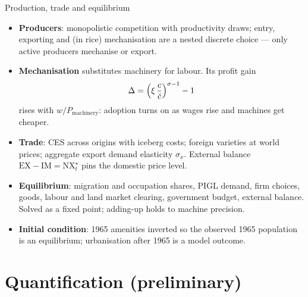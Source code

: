 \documentclass[10pt,aspectratio=169]{beamer}
\newcommand{\hl}[1]{\textcolor{mOrange}{#1}}
\begin{document}
\begin{frame}{Production, trade and equilibrium}
  \small
  \begin{itemize}
    \item \textbf{Producers}: monopolistic competition with productivity draws; entry,
          exporting and (in rice) mechanisation are a nested discrete choice --- only active
          producers mechanise or export.
    \item \textbf{Mechanisation} substitutes machinery for labour. Its profit gain
          \begin{equation*}
            \Delta=\Bigl(\xi\,\frac{c}{\breve c}\Bigr)^{\sigma-1}-1
          \end{equation*}
          rises with $w/P_{\text{machinery}}$: adoption turns on as \hl{wages rise and
          machines get cheaper}.
    \item \textbf{Trade}: CES across origins with iceberg costs; foreign varieties at
          world prices; aggregate export demand elasticity $\sigma_x$. External balance
          $\mathrm{EX}-\mathrm{IM}=\mathrm{NX}^\star_t$ pins the domestic price level.
    \item \textbf{Equilibrium}: migration and occupation shares, PIGL demand, firm choices,
          goods, labour and land market clearing, government budget, external balance.
          Solved as a fixed point; adding-up holds to machine precision.
    \item \textbf{Initial condition}: 1965 amenities inverted so the observed 1965
          population is an equilibrium; urbanisation after 1965 is a \hl{model outcome}.
  \end{itemize}
\end{frame}

\section{Quantification (preliminary)}
\end{document}
